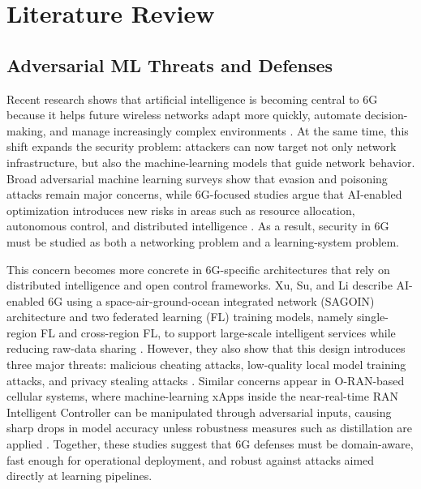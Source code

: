 \documentclass[letterpaper]{article} %
\begin{document}
\section{Literature Review}


\subsection{Adversarial ML Threats and Defenses}

Recent research shows that artificial intelligence is becoming central to 6G because it helps future wireless networks adapt more quickly, automate decision-making, and manage increasingly complex environments \cite{bountakas2023defense,xu2022security}. At the same time, this shift expands the security problem: attackers can now target not only network infrastructure, but also the machine-learning models that guide network behavior. Broad adversarial machine learning surveys show that evasion and poisoning attacks remain major concerns, while 6G-focused studies argue that AI-enabled optimization introduces new risks in areas such as resource allocation, autonomous control, and distributed intelligence \cite{bountakas2023defense,xu2022security}. As a result, security in 6G must be studied as both a networking problem and a learning-system problem.

This concern becomes more concrete in 6G-specific architectures that rely on distributed intelligence and open control frameworks. Xu, Su, and Li describe AI-enabled 6G using a space-air-ground-ocean integrated network (SAGOIN) architecture and two federated learning (FL) training models, namely single-region FL and cross-region FL, to support large-scale intelligent services while reducing raw-data sharing \cite{xu2022security}. However, they also show that this design introduces three major threats: malicious cheating attacks, low-quality local model training attacks, and privacy stealing attacks \cite{xu2022security}. Similar concerns appear in O-RAN-based cellular systems, where machine-learning xApps inside the near-real-time RAN Intelligent Controller can be manipulated through adversarial inputs, causing sharp drops in model accuracy unless robustness measures such as distillation are applied \cite{chiejina2024oran}. Together, these studies suggest that 6G defenses must be domain-aware, fast enough for operational deployment, and robust against attacks aimed directly at learning pipelines.
\end{document}
